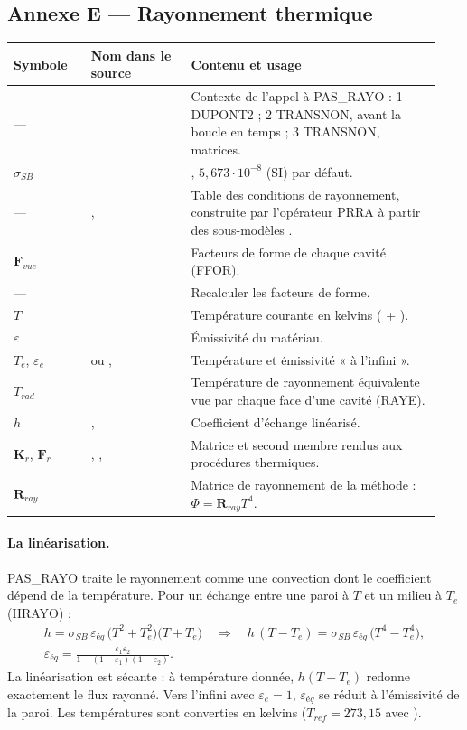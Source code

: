 \documentclass[11pt,a4paper]{article}
\makeatletter
\numberwithin{equation}{section}
\newcommand{\src}[1]{\texttt{\detokenize{#1}}}          %
\newcommand{\pr}[1]{\textsf{#1}}                        %
\newcommand{\op}[1]{\textsf{\small #1}}                 %
\newcommand{\vc}[1]{\symbf{#1}}                         %
\newenvironment{glossaire}[1][Glossaire]{%
  \par\smallskip\needspace{7\baselineskip}\noindent{\sffamily\bfseries\small #1}\par\nopagebreak
  \small
  \renewcommand{\arraystretch}{1.18}
  \begin{longtable}{@{}>{\raggedright\arraybackslash}p{0.17\linewidth}
                     >{\raggedright\arraybackslash}p{0.22\linewidth}
                     >{\raggedright\arraybackslash}p{0.555\linewidth}@{}}
  \toprule
  \textbf{Symbole} & \textbf{Nom dans le source} & \textbf{Contenu et usage}\\
  \midrule\endhead
  \bottomrule\endfoot}
  {\end{longtable}\addtocounter{table}{-1}\normalsize\vspace{-0.4em}}
\makeatother
\begin{document}
\subsection{Annexe E — Rayonnement thermique}

\begin{glossaire}
— & \src{IAPPEL} & Contexte de l'appel à \pr{PAS\_RAYO} : 1 \pr{DUPONT2} ; 2 \pr{TRANSNON}, avant la boucle en temps ; 3 \pr{TRANSNON}, matrices.\\
$\sigma_{SB}$ & \src{CTE_SB} & \src{CTE_STEFAN_BOLTZMANN}, $5{,}673\cdot10^{-8}$ (SI) par défaut.\\
— & \src{PRRA}, \src{WTAB.'RAYONNEMENT'} & Table des conditions de rayonnement, construite par l'opérateur \op{PRRA} à partir des sous-modèles \src{RAYONNEMENT}.\\
$\vc F_{vue}$ & \src{FAC_FORM} & Facteurs de forme de chaque cavité (\op{FFOR}).\\
— & \src{REA_GEOM} & Recalculer les facteurs de forme.\\
$T$ & \src{U_CAK2} & Température courante en kelvins (\src{THER_COURANT} + \src{TREF}).\\
$\varepsilon$ & \src{CH_EMI} & Émissivité \src{EMIS} du matériau.\\
$T_e$, $\varepsilon_e$ & \src{TERA} ou \src{T_IN}, \src{E_IN} & Température et émissivité « à l'infini ».\\
$T_{rad}$ & \src{TCAV} & Température de rayonnement équivalente vue par chaque face d'une cavité (\op{RAYE}).\\
$h$ & \src{HRAD}, \src{MAT_RAD} & Coefficient d'échange linéarisé.\\
$\vc K_r$, $\vc F_r$ & \src{RIG_RAD}, \src{ADDI_MATRICE}, \src{ADDI_SECOND} & Matrice et second membre rendus aux procédures thermiques.\\
$\vc R_{ray}$ & \src{MAT_RAYE} & Matrice de rayonnement de la méthode \src{TRAYO} : $\Phi = \vc R_{ray}T^4$.\\
\end{glossaire}

\paragraph{La linéarisation.}
\pr{PAS\_RAYO} traite le rayonnement comme une convection dont le coefficient dépend de la température.
Pour un échange entre une paroi à $T$ et un milieu à $T_e$ (\pr{HRAYO}) :
\begin{gather}
h = \sigma_{SB}\,\varepsilon_{éq}\,\big(T^2 + T_e^2\big)\big(T + T_e\big)
\quad\Longrightarrow\quad
h\,(T - T_e) = \sigma_{SB}\,\varepsilon_{éq}\,\big(T^4 - T_e^4\big),\\
\varepsilon_{éq} = \frac{\varepsilon_1\varepsilon_2}{1 - (1-\varepsilon_1)(1-\varepsilon_2)} .
\end{gather}
La linéarisation est sécante : à température donnée, $h(T - T_e)$ redonne exactement le flux rayonné.
Vers l'infini avec $\varepsilon_e = 1$, $\varepsilon_{éq}$ se réduit à l'émissivité de la paroi.
Les températures sont converties en kelvins ($T_{ref} = 273{,}15$ avec \src{CELSIUS}).
\end{document}
